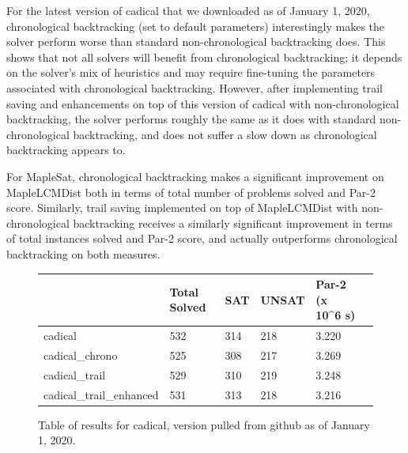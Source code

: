 \documentclass[runningheads]{llncs}
\begin{document}
For the latest version of cadical that we downloaded as of January 1,
2020, chronological backtracking (set to default parameters)
interestingly makes the solver perform worse than standard
non-chronological backtracking does. This shows that not all solvers
will benefit from chronological backtracking; it depends on the solver's
mix of heuristics and may require fine-tuning the parameters associated
with chronological backtracking. However, after implementing trail
saving and enhancements on top of this version of cadical with
non-chronological backtracking, the solver performs roughly the same as
it does with standard non-chronological backtracking, and does not
suffer a slow down as chronological backtracking appears to.

For MapleSat, chronological backtracking makes a significant improvement
on MapleLCMDist both in terms of total number of problems solved and
Par-2 score. Similarly, trail saving implemented on top of MapleLCMDist
with non-chronological backtracking receives a similarly significant
improvement in terms of total instances solved and Par-2 score, and
actually outperforms chronological backtracking on both measures.

\begin{figure}
    \begin{tabular}{|l|l|l|l|l|l|}
      \hline
      & Total Solved & SAT & UNSAT & Par-2 (x 10\textasciicircum{}6 s) \\ \hline
      cadical                  & 532          & 314 &  218  & 3.220                             \\ \hline
      cadical\_chrono          & 525          & 308 &  217  & 3.269                             \\ \hline
      cadical\_trail           & 529          & 310 &  219  & 3.248                             \\ \hline
      cadical\_trail\_enhanced & 531          & 313 &  218  & 3.216                             \\ \hline
    \end{tabular}
    \caption{Table of results for cadical, version pulled from github as of January 1, 2020.}
\end{figure}
\end{document}
